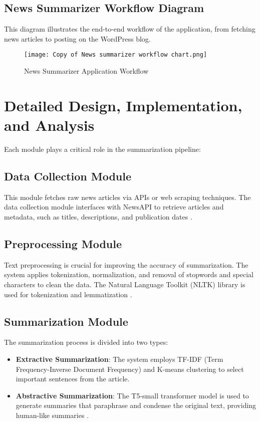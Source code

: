 \documentclass[12pt]{article}
\begin{document}
\subsection{News Summarizer Workflow Diagram}
This diagram illustrates the end-to-end workflow of the application, from fetching news articles to posting on the WordPress blog.

\begin{figure}[htbp]
    \centering
    \texttt{[image: Copy of News summarizer workflow chart.png]}
    \caption{News Summarizer Application Workflow}
    \label{fig:workflow}
\end{figure}

\newpage
\section{Detailed Design, Implementation, and Analysis}
Each module plays a critical role in the summarization pipeline:

\subsection{Data Collection Module}
This module fetches raw news articles via APIs or web scraping techniques. The data collection module interfaces with NewsAPI to retrieve articles and metadata, such as titles, descriptions, and publication dates \citep{newsapi}.

\subsection{Preprocessing Module}
Text preprocessing is crucial for improving the accuracy of summarization. The system applies tokenization, normalization, and removal of stopwords and special characters to clean the data. The Natural Language Toolkit (NLTK) library is used for tokenization and lemmatization \citep{manning1999foundations}.

\subsection{Summarization Module}
The summarization process is divided into two types:
\begin{itemize}
    \item \textbf{Extractive Summarization}: The system employs TF-IDF (Term Frequency-Inverse Document Frequency) and K-means clustering to select important sentences from the article.
    \item \textbf{Abstractive Summarization}: The T5-small transformer model is used to generate summaries that paraphrase and condense the original text, providing human-like summaries \citep{raffel2020exploring}.
\end{itemize}
\end{document}
